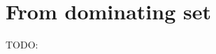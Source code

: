 \section{From dominating set}\label{sect: from dominating set}

\begin{yoshiki}
    TODO:
\end{yoshiki}

\cite{williamsFasterDecisionFirstorder2014}